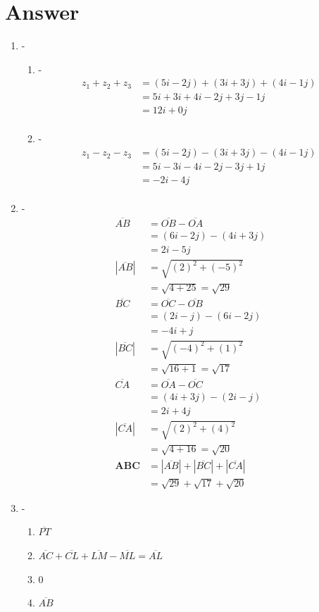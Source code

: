 \documentclass[12pt,titlepage]{article}
\begin{document}
\section*{Answer}
\begin{enumerate}
    \item -
    \begin{enumerate}[label=\alph*)]
        \item -
        \begin{align*}
            z_1+z_2+z_3&=(5i-2j)+(3i+3j)+(4i-1j)\\
            &=5i+3i+4i-2j+3j-1j\\
            &=12i+0j\\
        \end{align*}
        \item -
        \begin{align*}
            z_1-z_2-z_3&=(5i-2j)-(3i+3j)-(4i-1j)\\
            &=5i-3i-4i-2j-3j+1j\\
            &=-2i-4j\\
        \end{align*}
    \end{enumerate}
    \item -
    \begin{align*}
        \overline{AB}&=\overline{OB}-\overline{OA}\\
        &=(6i-2j)-(4i+3j)\\
        &=2i-5j\\
        \left|\overline{AB}\right|&=\sqrt{(2)^2+(-5)^2}\\
        &=\sqrt{4+25}=\sqrt{29}\\
        \overline{BC}&=\overline{OC}-\overline{OB}\\
        &=(2i-j)-(6i-2j)\\
        &=-4i+j\\
        \left|\overline{BC}\right|&=\sqrt{(-4)^2+(1)^2}\\
        &=\sqrt{16+1}=\sqrt{17}\\
        \overline{CA}&=\overline{OA}-\overline{OC}\\
        &=(4i+3j)-(2i-j)\\
        &=2i+4j\\
        \left|\overline{CA}\right|&=\sqrt{(2)^2+(4)^2}\\
        &=\sqrt{4+16}=\sqrt{20}\\ 
        \textbf{ABC}&=\left|\overline{AB}\right|+\left|\overline{BC}\right|+\left|\overline{CA}\right|\\
        &=\sqrt{29}+\sqrt{17}+\sqrt{20}
    \end{align*}
    \item -
    \begin{enumerate}[label=\alph*)]
        \item $\overline{PT}$
        \item $\overline{AC}+\overline{CL}+\overline{LM}-\overline{ML}=\overline{AL}$
        \item $0$
        \item $\overline{AB}$
    \end{enumerate}
\end{enumerate}
\end{document}

